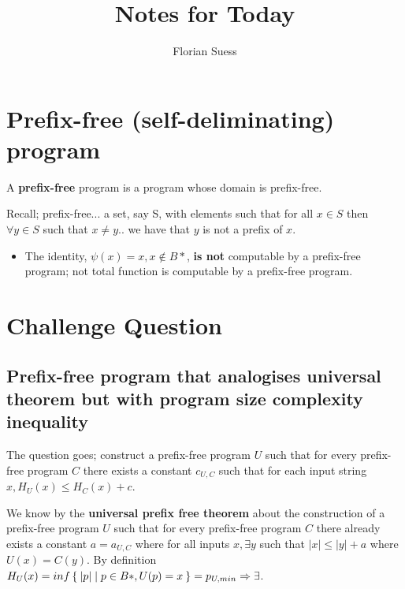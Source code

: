 \documentclass{article}
\title {Notes for Today}
\author {Florian Suess}
\begin{document}
\maketitle
\section{Prefix-free (self-deliminating) program}

A \textbf{prefix-free} program is a program whose domain is prefix-free.

Recall; prefix-free... a set, say S, with elements such that for all $x \in S$ then $\forall y \in S$ such that $x \not = y$.. we have that $y$ is not a prefix of $x$.

\begin{itemize}
	\item The identity, $\psi(x) = x, x \not\in B*$, \textbf{is not} computable by a prefix-free program; not total function is computable by a prefix-free program.
\end{itemize}

\section{Challenge Question}
\subsection{Prefix-free program that analogises universal theorem but with program size complexity inequality}
The question goes; construct a prefix-free program $U$ such that for every prefix-free program $C$ there exists a constant $c_{U,C}$ such that for each input string $x, H_U(x) \leq H_C(x) + c$.

We know by the \textbf{universal prefix free theorem} about the construction of a prefix-free program $U$ such that for every prefix-free program $C$ there already exists a constant $a = a_{U,C}$ where for all inputs $x, \exists y$ such that $|x| \leq |y| + a$ where $U(x) = C(y)$. By definition $H_U(x) = inf\Set{ \vert p \vert | p \in B*, U(p) = x } = p_{U, min} \Rightarrow \exists $.
\end{document}
